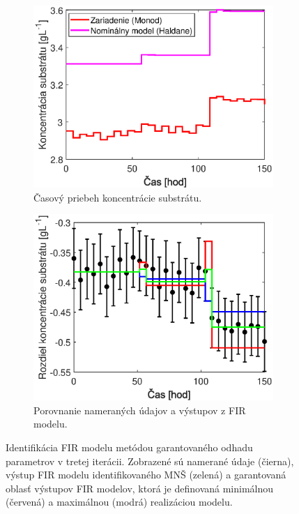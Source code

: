 \begin{figure}
	\centering
	\begin{subfigure}[b]{0.49\textwidth}
		\centering
		\includegraphics[width=\linewidth]{images/FIR_sub_data}
		\caption{Časový priebeh koncentrácie substrátu.\newline}
		\label{fig:FIR_sub_data}
	\end{subfigure}
	\begin{subfigure}[b]{0.49\textwidth}
		\centering
		\includegraphics[width=\linewidth]{images/FIR_sub_ident}
		\caption{Porovnanie nameraných údajov a výstupov z FIR modelu.}
		\label{fig:FIR_sub_ident}
	\end{subfigure}
	\caption{Identifikácia FIR modelu metódou garantovaného odhadu parametrov v tretej iterácii. Zobrazené sú namerané údaje (čierna), výstup FIR modelu identifikovaného MNŠ (zelená) a garantovaná oblasť výstupov FIR modelov, ktorá je definovaná minimálnou (červená) a maximálnou (modrá) realizáciou modelu.}
	\label{fig:FIR_sub_identification}
\end{figure}

